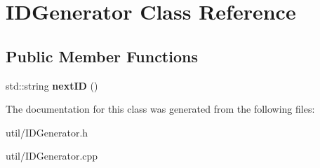 \hypertarget{classIDGenerator}{}\section{I\+D\+Generator Class Reference}
\label{classIDGenerator}
\subsection*{Public Member Functions}
\begin{DoxyCompactItemize}
\item 
std\+::string {\bfseries next\+ID} ()\hypertarget{classIDGenerator_a223bf057a0ad9e69df527142dfe1e91b}{}\label{classIDGenerator_a223bf057a0ad9e69df527142dfe1e91b}

\end{DoxyCompactItemize}


The documentation for this class was generated from the following files\+:\begin{DoxyCompactItemize}
\item 
util/I\+D\+Generator.\+h\item 
util/I\+D\+Generator.\+cpp\end{DoxyCompactItemize}
